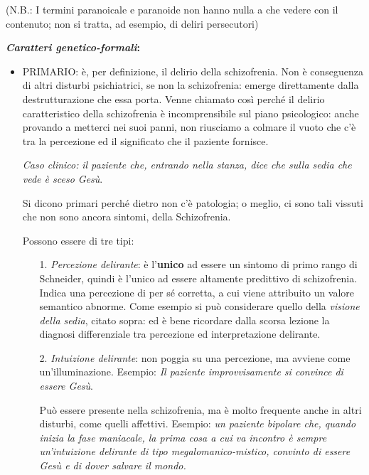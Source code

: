 (N.B.: I termini paranoicale e paranoide non hanno nulla a che vedere
con il contenuto; non si tratta, ad esempio, di deliri persecutori)

\textbf{\emph{Caratteri genetico-formali}: }

\begin{itemize}
\item
  PRIMARIO: è, per definizione, il delirio della schizofrenia. Non è
  conseguenza di altri disturbi psichiatrici, se non la schizofrenia:
  emerge direttamente dalla destrutturazione che essa porta. Venne
  chiamato così perché il delirio caratteristico della schizofrenia è
  incomprensibile sul piano psicologico: anche provando a metterci nei
  suoi panni, non riusciamo a colmare il vuoto che c'è tra la percezione
  ed il significato che il paziente fornisce.

\emph{Caso clinico:} \emph{il paziente che, entrando nella stanza, dice
che sulla sedia che vede è sceso Gesù}.

Si dicono primari perché dietro non c'è patologia; o meglio, ci sono
tali vissuti che non sono ancora sintomi, della Schizofrenia.

Possono essere di tre tipi:

\begin{itemize}
\item[1.]
  \emph{Percezione delirante}: è l'\textbf{unico} ad essere un sintomo
  di primo rango di Schneider, quindi è l'unico ad essere altamente
  predittivo di schizofrenia. Indica una percezione di per sé corretta,
  a cui viene attribuito un valore semantico abnorme. Come esempio si
  può considerare quello della \emph{visione della sedia}, citato sopra:
  ed è bene ricordare dalla scorsa lezione la diagnosi differenziale tra
  percezione ed interpretazione delirante.
\item[2.]
  \emph{Intuizione delirante}: non poggia su una percezione, ma avviene
  come un'illuminazione. Esempio: \emph{Il paziente improvvisamente si
  convince di essere Gesù}.

Può essere presente nella schizofrenia, ma è molto frequente anche in
altri disturbi, come quelli affettivi. Esempio: \emph{un paziente
bipolare che, quando inizia la fase maniacale, la prima cosa a cui va
incontro è sempre un'intuizione delirante di tipo megalomanico-mistico,
convinto di essere Gesù e di dover salvare il mondo.}


\end{itemize}
\end{itemize}
